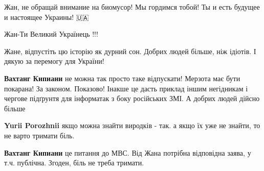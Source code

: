 \begin{itemize}
 
Жан, не обращай внимание на биомусор! Мы гордимся тобой! Ты и есть будущее и настоящее Украины! 🇺🇦💪🏼

 
Жан-Ти Великий Українець !!!


Жане, відпустіть цю історію як дурний сон. Добрих людей більше, ніж ідіотів. І дякую за перемогу для України!

\begin{itemize}
 
\textbf{Вахтанг Кипиани} не можна так просто таке відпускати! Мерзота має бути покарана! За законом. Показово! Інакше це дасть приклад іншим негідникам і чергове підґрунтя для інформатак з боку російських ЗМІ.
А добрих людей дійсно більше \Laughey[1.0][white]

 

\textbf{Yurii Porozhnii} якщо можна знайти виродків - так. а якщо їх уже не знайти, то не варто тримати біль.

 
\textbf{Вахтанг Кипиани} це питання до МВС. Від Жана потрібна відповідна заява, у т.ч. публічна.
Згоден, біль не треба тримати.


\end{itemize}
\end{itemize}
